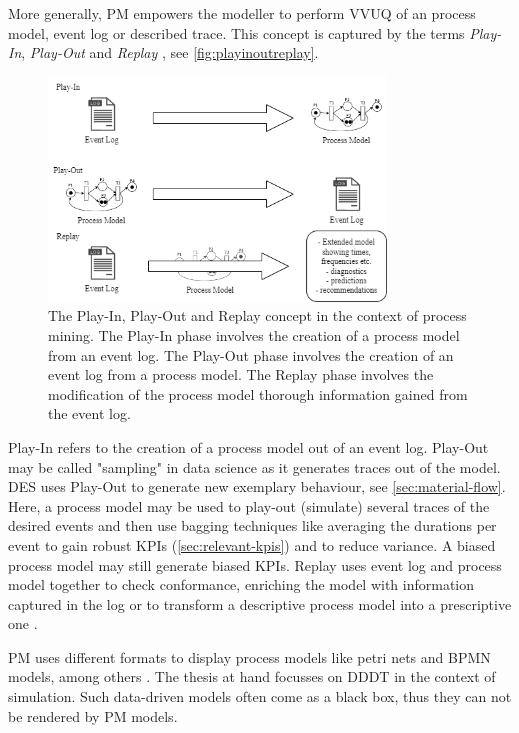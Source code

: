 More generally, PM empowers the modeller to perform VVUQ of an process model, event log or described trace. This concept is captured by the terms \textit{Play-In}, \textit{Play-Out} and \textit{Replay} \autocite{damm2001lscs}, see \autoref{fig:playinoutreplay}.

\begin{figure}[htbp]
  \centering
  \includegraphics[width=0.8\textwidth]{figures/playinplayoutreplay.png}
  \caption{The Play-In, Play-Out and Replay concept in the context of process mining. The Play-In phase involves the creation of a process model from an event log. The Play-Out phase involves the creation of an event log from a process model. The Replay phase involves the modification of the process model thorough information gained from the event log.}
  \label{fig:playinoutreplay}
\end{figure}

Play-In refers to the creation of a process model out of an event log. Play-Out may be called "sampling" in data science as it generates traces out of the model. DES uses Play-Out to generate new exemplary behaviour, see \autoref{sec:material-flow}. Here, a process model may be used to play-out (simulate) several traces of the desired events and then use bagging techniques like averaging the durations per event to gain robust KPIs (\autoref{sec:relevant-kpis}) and to reduce variance. A biased process model may still generate biased KPIs. Replay uses event log and process model together to check conformance, enriching the model with information captured in the log or to transform a descriptive process model into a prescriptive one \autocite{van2016data}.

PM uses different formats to display process models like petri nets and BPMN models, among others \autocite{vanderAalst2012}. The thesis at hand focusses on DDDT in the context of simulation. Such data-driven models often come as a black box, thus they can not be rendered by PM models.

